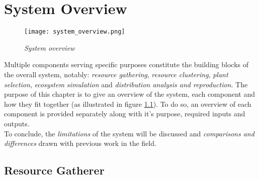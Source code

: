 \chapter{System Overview} \label{chap:system_overview}

\begin{figure}
\center
	\texttt{[image: system\_overview.png]}
	\caption{\textit{System overview}}	
	\label{fig:system_overview}
\end{figure}

Multiple components serving specific purposes constitute the building blocks of the overall system, notably: \textit{resource gathering}, \textit{resource clustering}, \textit{plant selection}, \textit{ecosystem simulation} and \textit{distribution analysis and reproduction}. The purpose of this chapter is to give an overview of the system, each component and how they fit together (as illustrated in figure \ref{fig:system_overview}). To do so, an overview of each component is provided separately along with it's purpose, required inputs and outputs.\\
To conclude, the \textit{limitations} of the system will be discussed and \textit{comparisons and differences} drawn with previous work in the field.

\section{Resource Gatherer} \label{sec:resource_gatherer}

